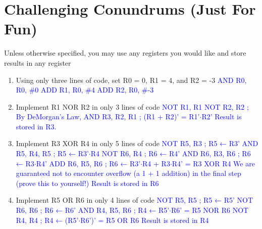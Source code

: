 \documentclass{article}
\begin{document}
    \section{Challenging Conundrums (Just For Fun)}
    Unless otherwise specified, you may use any registers you would like and store results in any register
    \begin{enumerate}[label=(\alph*), itemsep = 10pt]
        \item Using only three lines of code, set R0 = 0, R1 = 4, and R2 = -3
        \newline \textcolor{blue}{AND R0, R0, \#0 \newline ADD R1, R0, \#4 \newline ADD R2, R0, \#-3}
        \item Implement R1 NOR R2 in only 3 lines of code
        \newline \textcolor{blue}{NOT R1, R1 \newline
NOT R2, R2               ; By DeMorgan’s Law, \newline
AND R3, R2, R1           ; (R1 + R2)' = R1’$\cdot$R2’ \newline 
\newline 
Result is stored in R3.
}
        \item Implement R3 XOR R4 in only 5 lines of code
        \newline \textcolor{blue}{NOT R5, R3               ; R5 ← R3’
\newline AND R5, R4, R5			; R5 ← R3’$\cdot$R4
\newline NOT R6, R4               ; R6 ← R4’
\newline AND R6, R3, R6			; R6 ← R3$\cdot$R4’
\newline ADD R6, R5, R6			; R6 ← R3’$\cdot$R4 + R3$\cdot$R4’ = R3 XOR R4
\newline 
\newline We are guaranteed not to encounter overflow (a 1 + 1 addition) in the final step (prove this to yourself!)
\newline Result is stored in R6}

        \item Implement R5 OR R6 in only 4 lines of code
        \newline \textcolor{blue}{NOT R5, R5		        ; R5 ← R5’
\newline NOT R6, R6             ; R6 ← R6’
\newline AND R4, R5, R6			; R4 ← R5'$\cdot$R6’ = R5 NOR R6
\newline NOT R4, R4     		; R4 ← (R5'$\cdot$R6’)' = R5 OR R6
\newline 
\newline Result is stored in R4}
    \end{enumerate}

 
    
\end{document}
